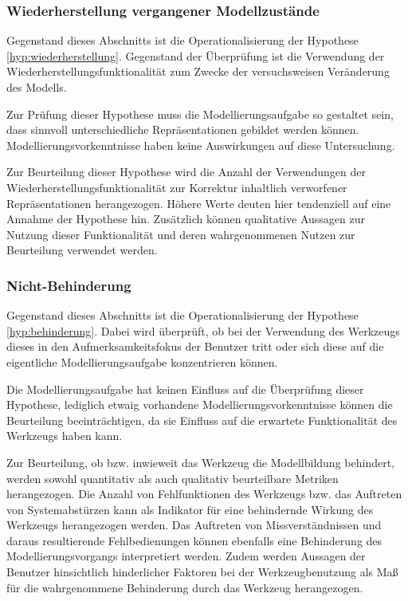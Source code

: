 
\subsubsection{Wiederherstellung vergangener Modellzustände} %
\label{ssub:wiederherstellung_vergangener_modellzustände}

Gegenstand dieses Abschnitts ist die Operationalisierung der Hypothese \ref{hyp:wiederherstellung}. Gegenstand der Überprüfung ist die Verwendung der Wiederherstellungsfunktionalität zum Zwecke der versuchsweisen Veränderung des Modells.

Zur Prüfung dieser Hypothese muss die Modellierungsaufgabe so gestaltet sein, dass sinnvoll unterschiedliche Repräsentationen gebildet werden können. Modellierungsvorkenntnisse haben keine Auswirkungen auf diese Untersuchung.

Zur Beurteilung dieser Hypothese wird die Anzahl der Verwendungen der Wiederherstellungsfunktionalität zur Korrektur inhaltlich verworfener Repräsentationen herangezogen. Höhere Werte deuten hier tendenziell auf eine Annahme der Hypothese hin. Zusätzlich können qualitative Aussagen zur Nutzung dieser Funktionalität und deren wahrgenommenen Nutzen zur Beurteilung verwendet werden. 


\subsubsection{Nicht-Behinderung} %
\label{ssub:nicht_behinderung}

Gegenstand dieses Abschnitts ist die Operationalisierung der Hypothese \ref{hyp:behinderung}. Dabei wird überprüft, ob bei der Verwendung des Werkzeugs dieses in den Aufmerksamkeitsfokus der Benutzer tritt oder sich diese auf die eigentliche Modellierungsaufgabe konzentrieren können. 

Die Modellierungsaufgabe hat keinen Einfluss auf die Überprüfung dieser Hypothese, lediglich etwaig vorhandene Modellierungsvorkenntnisse können die Beurteilung beeinträchtigen, da sie Einfluss auf die erwartete Funktionalität des Werkzeugs haben kann.

Zur Beurteilung, ob bzw. inwieweit das Werkzeug die Modellbildung behindert, werden sowohl quantitativ als auch qualitativ beurteilbare Metriken herangezogen. Die Anzahl von Fehlfunktionen des Werkzeugs bzw. das Auftreten von Systemabstürzen kann als Indikator für eine behindernde Wirkung des Werkzeugs herangezogen werden. Das Auftreten von Missverständnissen und daraus resultierende Fehlbedienungen können ebenfalls eine Behinderung des Modellierungsvorgangs interpretiert werden. Zudem werden Aussagen der Benutzer hinsichtlich hinderlicher Faktoren bei der Werkzeugbenutzung als Maß für die wahrgenommene Behinderung durch das Werkzeug herangezogen.

